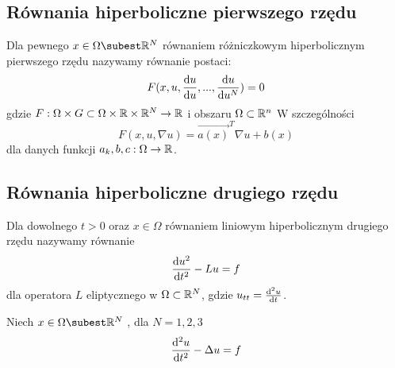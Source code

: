 \documentclass[12pt,a4paper]{report}
\begin{document}
\subsection{Równania hiperboliczne pierwszego rzędu}
Dla pewnego $ x \in \Omega \subest \setR^{N} $ równaniem różniczkowym hiperbolicznym pierwszego rzędu nazywamy równanie postaci:
$$
F(x,u,\ddx[{ u}]{u},...,\ddx[{u}]{u^N}) = 0
$$
gdzie $F : \Omega \times G \subset \Omega \times \setR \times \setR^{N} \to \setR$ i obszaru $\Omega \subset \setR^n $
\newline
W szczególności 
$$
F(x,u,\nabla u) = \vec{a(x)}^T \nabla u + b(x)
$$
dla danych funkcji $ a_k,b,c: \Omega \to \setR$. 
\subsection{Równania hiperboliczne drugiego rzędu} 
Dla dowolnego $t>0$ oraz $ x \in \Omega $ równaniem liniowym hiperbolicznym drugiego rzędu nazywamy równanie 
$$
\ddx[u^2]{t^2} - Lu = f
$$ 
dla operatora $L$ eliptycznego w $\Omega \subset \setR^N$, gdzie $ u_{tt} = \ddx[^2u]{t}$.  
\begin{example}
Niech $x \in \Omega \subest \setR^N $ , dla $ N = 1,2,3$
$$
\ddx[^2u]{t^2} - \Delta u = f 
$$
\end{example}
\end{document}
